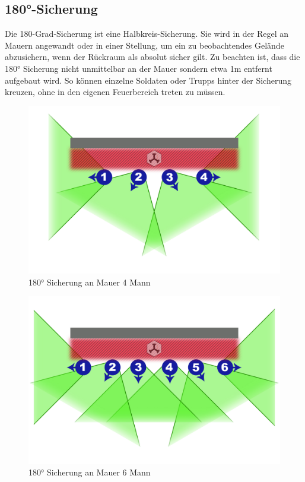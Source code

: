 \subsection{180°-Sicherung}
	Die 180-Grad-Sicherung ist eine Halbkreis-Sicherung. Sie wird in der Regel an Mauern angewandt oder in einer Stellung, um ein zu beobachtendes Gelände abzusichern, wenn der Rückraum als absolut sicher gilt. Zu beachten ist, dass die 180° Sicherung nicht unmittelbar an der Mauer sondern etwa 1m entfernt aufgebaut wird. So können einzelne Soldaten oder Trupps hinter der Sicherung kreuzen, ohne in den eigenen Feuerbereich treten zu müssen. \\
	\begin{figure}[htbp]
		\centering
		\includegraphics[width=15cm]{./img/grundlagen/sicherungen/180grad_sicherung_4mann.jpg}
		\caption{180° Sicherung an Mauer 4 Mann}
		\end{figure}
		
		\begin{figure}[htbp]
			\centering
			\includegraphics[width=15cm]{./img/grundlagen/sicherungen/180grad_sicherung_6mann.jpg}
			\caption{180° Sicherung an Mauer 6 Mann}
		\end{figure}
\newpage